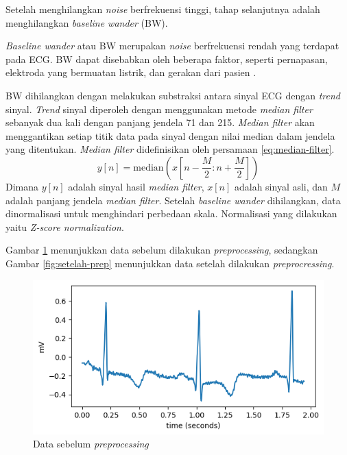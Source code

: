 Setelah menghilangkan \textit{noise} berfrekuensi tinggi, tahap selanjutnya adalah menghilangkan \textit{baseline wander} (BW).

\textit{Baseline wander} atau BW merupakan \textit{noise} berfrekuensi rendah yang terdapat pada ECG.
BW dapat disebabkan oleh beberapa faktor, seperti pernapasan, elektroda yang bermuatan listrik, dan gerakan dari pasien \parencite{lenisComparisonBaselineWander2017}.

BW dihilangkan dengan melakukan substraksi antara sinyal ECG dengan \textit{trend} sinyal.
\textit{Trend} sinyal diperoleh dengan menggunakan metode \textit{median filter} sebanyak dua kali dengan panjang jendela 71 dan 215.
\textit{Median filter} akan menggantikan setiap titik data pada sinyal dengan nilai median dalam jendela yang ditentukan.
\textit{Median filter} didefinisikan oleh persamaan \ref{eq:median-filter}.
\begin{equation}
    y[n] = \text{median}(x[n - \frac{M}{2} : n + \frac{M}{2}])
    \label{eq:median-filter}
\end{equation}
Dimana $y[n]$ adalah sinyal hasil \textit{median filter}, $x[n]$ adalah sinyal asli, dan $M$ adalah panjang jendela \textit{median filter}.
Setelah \textit{baseline wander} dihilangkan, data dinormalisasi untuk menghindari perbedaan skala.
Normalisasi yang dilakukan yaitu \textit{Z-score normalization}.

Gambar \ref{fig:sebelum-prep} menunjukkan data sebelum dilakukan \textit{preprocessing}, sedangkan Gambar \ref{fig:setelah-prep} menunjukkan data setelah dilakukan \textit{preprocressing}.

\begin{figure}[H]
    \centering
    \includegraphics[width=0.6\linewidth]{./img/sebelum_prep.png}
	\caption{Data sebelum \textit{preprocessing}}
	\label{fig:sebelum-prep}
\end{figure}

